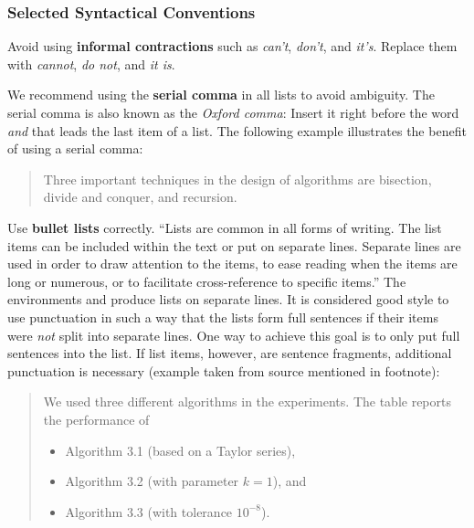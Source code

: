 \subsubsection{Selected Syntactical Conventions}

Avoid using \textbf{informal contractions} such as \emph{can't}, \emph{don't}, and \emph{it's}. Replace them with \emph{cannot}, \emph{do not}, and \emph{it is}.

We recommend using the \textbf{serial comma} in all lists to avoid ambiguity. The serial comma is also known as the \emph{Oxford comma}: Insert  it right before the word \emph{and} that leads the last item of a list. The following example%
illustrates the benefit of using a serial comma:
\begin{quote}
  Three important techniques in the design of algorithms are bisection, divide and conquer, and recursion.
\end{quote}

Use \textbf{bullet lists} correctly. ``Lists are common in all forms of writing. The list items can be included within the text or put on separate lines. Separate lines are used in order to draw attention to the items, to ease reading when the items are long or numerous, or to facilitate cross-reference to specific items.'' The environments  and  produce lists on separate lines. It is considered good style to use punctuation in such a way that the lists form full sentences if their items were \emph{not} split into separate lines. One way to achieve this goal is to only put full sentences into the list. If list items, however, are sentence fragments, additional punctuation is necessary (example taken from source mentioned in footnote):

\begin{quote}
  We used three different algorithms in the experiments. The table reports the performance of
\begin{itemize}
\item Algorithm 3.1 (based on a Taylor series),
\item Algorithm 3.2 (with parameter \(k = 1\)), and
\item Algorithm 3.3 (with tolerance \(10^{-8}\)).
\end{itemize}
\end{quote}

